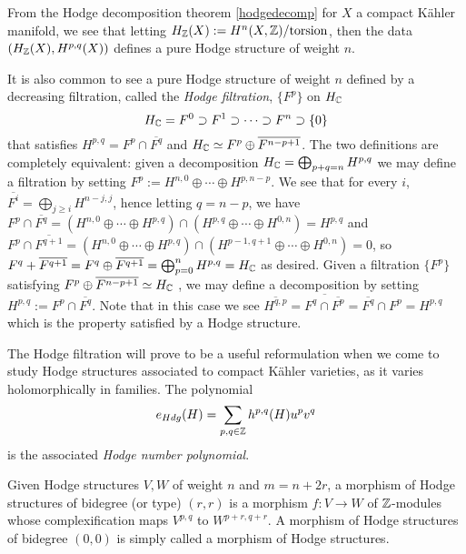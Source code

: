 \documentclass[../main.tex]{subfiles}
\begin{document}
\begin{es}
From the Hodge decomposition theorem \ref{hodgedecomp} for $X$ a compact K\"{a}hler manifold, we see that letting $H_{\mathbb{Z}}(X):=H^n(X,\mathbb{Z})/\mathrm{torsion}$, then the data $(H_{\mathbb{Z}}(X),H^{p,q}(X))$ defines a pure Hodge structure of weight $n$. 
\end{es}


It is also common to see a pure Hodge structure of weight $n$ defined by a decreasing filtration, called the \emph{Hodge filtration}, $\{F^p\}$ on $H_{\mathbb{C}}$
\[ H_{\mathbb{C}} = F^0 \supset F^1 \supset \cdots \supset F^n \supset \{0\}\]
that satisfies $ H^{p,q} = {F^p} \cap \overline{F^q} $ and $H_{\mathbb{C}} \simeq F^p \oplus \overline{F^{n-p+1}}$. The two definitions are completely equivalent: given a decomposition $H_{\mathbb{C}} = \bigoplus_{p+q = n} H^{p,q}$ we may define a filtration by setting $F^p := H^{n,0} \oplus \cdots \oplus H^{p,n-p}$. We see that for every $i$, $\overline{F^i} =  \bigoplus_{j \geq i} H^{n-j,j} $, hence letting $q = n-p$, we have  ${F^p} \cap \overline{F^q} = ( H^{n,0} \oplus \cdots \oplus H^{p,q} ) \cap (H^{p,q} \oplus \cdots \oplus H^{0,n} )
= H^{p,q}$ and  ${F^p} \cap \overline{F^{q+1}} = ( H^{n,0} \oplus \cdots \oplus H^{p,q} ) \cap (H^{p-1,q+1} \oplus \cdots \oplus H^{0,n} ) = 0$, so ${F^q} + \overline{F^{q+1}} = {F^q} \oplus \overline{F^{q+1}} = \bigoplus_{p=0}^n H^{p,q} = H_{\mathbb{C}} $ as desired.
Given a filtration $\{F^p\}$ satisfying $ F^p \oplus \overline{F^{n-p+1}} \simeq H_{\mathbb{C}} $ , we may define a decomposition by setting $H^{p,q} := F^p \cap \overline{F^q}$. Note that in this case we see $\overline{H^{q,p}} = \overline{ F^q \cap \overline{F^p} } = \overline{ F^q} \cap {F^p}  = H^{p,q} $ which is the property satisfied by a Hodge structure.

The Hodge filtration will prove to be a useful reformulation when we come to study Hodge structures associated to compact K\"{a}hler varieties, as it varies holomorphically in families. 
The polynomial
\begin{align}
e_{Hdg}(H) = \sum_{p,q \in \mathbb{Z}} h^{p,q}(H)u^pv^q \label{HdgPol}
\end{align}
is the associated \emph{Hodge number polynomial}.


Given Hodge structures $V,W$ of weight $n$ and $m=n+2r$, a morphism of Hodge structures of bidegree (or type) $(r,r)$ is a morphism $f \colon V \to W$ of $\mathbb{Z}$-modules whose complexification maps $V^{p,q}$ to $W^{p+r,q+r}$. A morphism of Hodge structures of bidegree $(0,0)$ is simply called a morphism of Hodge structures.
\end{document}
